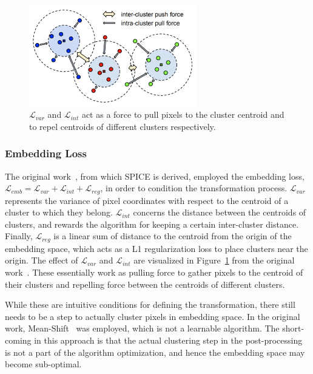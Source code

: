 \documentclass{ws-rv9x6}
\begin{document}
\begin{figure}[t]
    \centering
    \includegraphics[width=0.65\textwidth]{figures/embedding_loss.pdf}
    \caption{$\mathcal{L}_{var}$ and $\mathcal{L}_{int}$ act as a force to pull pixels to the cluster centroid and to repel centroids of different clusters respectively.}
    \label{fig:clustering:embedding_loss}
\end{figure}

\subsubsection{Embedding Loss}
The original work~\cite{disc}, from which SPICE is derived, employed the embedding loss, $\mathcal{L}_{emb}=\mathcal{L}_{var}+\mathcal{L}_{int}+\mathcal{L}_{reg}$, in order to condition the transformation process. $\mathcal{L}_{var}$ represents the variance of pixel coordinates with respect to the centroid of a cluster to which they belong. $\mathcal{L}_{int}$ concerns the distance between the centroids of clusters, and rewards the algorithm for keeping a certain inter-cluster distance. Finally, $\mathcal{L}_{reg}$ is a linear sum of distance to the centroid from the origin of the embedding space, which acts as a L1 regularization loss to place clusters near the origin. The effect of $\mathcal{L}_{var}$ and $\mathcal{L}_{int}$ are visualized in Figure~\ref{fig:clustering:embedding_loss} from the original work~\cite{disc}. These essentially work as pulling force to gather pixels to the centroid of their clusters and repelling force between the centroids of different clusters. 

While these are intuitive conditions for defining the transformation, there still needs to be a step to actually cluster pixels in embedding space. In the original work, Mean-Shift~\cite{1000236} was employed, which is not a learnable algorithm. The short-coming in this approach is that the actual clustering step in the post-processing is not a part of the algorithm optimization, and hence the embedding space may become sub-optimal. 
\end{document}
